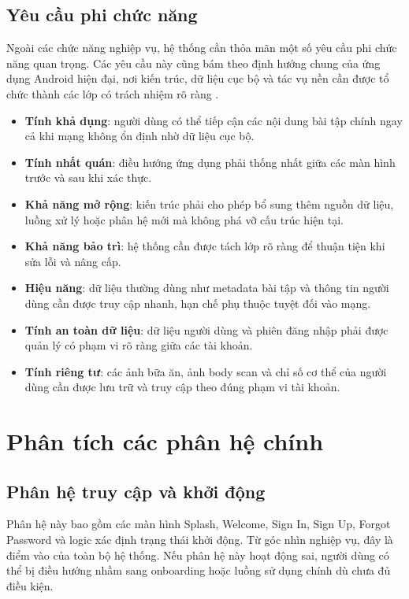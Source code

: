 \subsection{Yêu cầu phi chức năng}

Ngoài các chức năng nghiệp vụ, hệ thống cần thỏa mãn một số yêu cầu phi chức năng quan trọng. Các yêu cầu này cũng bám theo định hướng chung của ứng dụng Android hiện đại, nơi kiến trúc, dữ liệu cục bộ và tác vụ nền cần được tổ chức thành các lớp có trách nhiệm rõ ràng \cite{android_jetpack,android_room,android_workmanager}.

\begin{itemize}
    \item \textbf{Tính khả dụng}: người dùng có thể tiếp cận các nội dung bài tập chính ngay cả khi mạng không ổn định nhờ dữ liệu cục bộ.
    \item \textbf{Tính nhất quán}: điều hướng ứng dụng phải thống nhất giữa các màn hình trước và sau khi xác thực.
    \item \textbf{Khả năng mở rộng}: kiến trúc phải cho phép bổ sung thêm nguồn dữ liệu, luồng xử lý hoặc phân hệ mới mà không phá vỡ cấu trúc hiện tại.
    \item \textbf{Khả năng bảo trì}: hệ thống cần được tách lớp rõ ràng để thuận tiện khi sửa lỗi và nâng cấp.
    \item \textbf{Hiệu năng}: dữ liệu thường dùng như metadata bài tập và thông tin người dùng cần được truy cập nhanh, hạn chế phụ thuộc tuyệt đối vào mạng.
    \item \textbf{Tính an toàn dữ liệu}: dữ liệu người dùng và phiên đăng nhập phải được quản lý có phạm vi rõ ràng giữa các tài khoản.
    \item \textbf{Tính riêng tư}: các ảnh bữa ăn, ảnh body scan và chỉ số cơ thể của người dùng cần được lưu trữ và truy cập theo đúng phạm vi tài khoản.
\end{itemize}

\section{Phân tích các phân hệ chính}

\subsection{Phân hệ truy cập và khởi động}

Phân hệ này bao gồm các màn hình Splash, Welcome, Sign In, Sign Up, Forgot Password và logic xác định trạng thái khởi động. Từ góc nhìn nghiệp vụ, đây là điểm vào của toàn bộ hệ thống. Nếu phân hệ này hoạt động sai, người dùng có thể bị điều hướng nhầm sang onboarding hoặc luồng sử dụng chính dù chưa đủ điều kiện.

